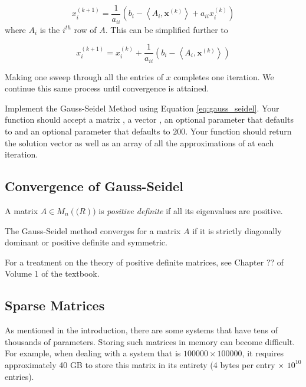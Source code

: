 $$
x^{(k+1)}_i = \frac{1}{a_{ii}} \left ( b_i - \left < A_i, \mathbf{x}^{(k)} \right > + a_{ii}x^{(k)}_i \right )
$$
where $A_i$ is the $i^{th}$ row of $A$. This can be simplified further to

\begin{equation} \label{eq:gauss_seidel}
x^{(k+1)}_i = x^{(k)}_i + \frac{1}{a_{ii}} \left ( b_i - \left < A_i, \mathbf{x}^{(k)}\right >\right)
\end{equation}

Making one sweep through all the entries of $x$ completes one iteration. We continue this same process until convergence is attained.

\begin{problem} \label{prob:gauss_seidel}
Implement the Gauss-Seidel Method using Equation \ref{eq:gauss_seidel}. Your function should accept a matrix , a vector , an optional parameter  that defaults to  and an optional parameter  that defaults to $200$. Your function should return the solution vector  as well as an array of all the approximations of  at each iteration.
\end{problem}

\subsection*{Convergence of Gauss-Seidel}
\begin{definition}
    A matrix $A \in M_n(\mathbb(R))$ is \emph{positive definite} if all its eigenvalues are positive.
\end{definition}

\begin{theorem}
    The Gauss-Seidel method converges for a matrix $A$ if it is strictly diagonally dominant or positive definite and symmetric.
\end{theorem}

For a treatment on the theory of positive definite matrices, see Chapter ?? of Volume 1 of the textbook.

\subsection*{Sparse Matrices}
As mentioned in the introduction, there are some systems that have tens of thousands of parameters. Storing such matrices in memory can become difficult. For example, when dealing with a system that is $100000 \times 100000$, it requires approximately 40 GB to store this matrix in its entirety (4 bytes per entry $\times$ $10^{10}$ entries).

